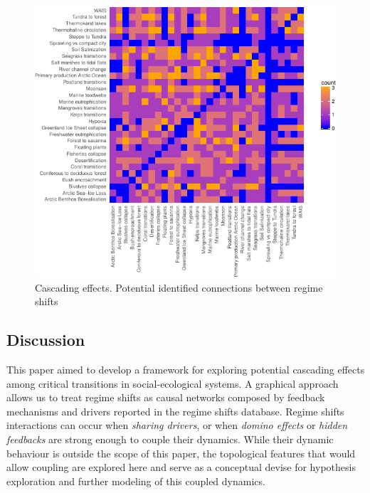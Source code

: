 \documentclass[9pt,]{article}
\begin{document}
\begin{figure}

{\centering \includegraphics{170830_draftCascadingEffects_files/figure-latex/Fig6-1} 

}

\caption{Cascading effects. Potential identified connections between regime shifts}\label{fig:Fig6}
\end{figure}

\subsection{Discussion}\label{discussion}

This paper aimed to develop a framework for exploring potential
cascading effects among critical transitions in social-ecological
systems. A graphical approach allows us to treat regime shifts as causal
networks composed by feedback mechanisms and drivers reported in the
regime shifts database. Regime shifts interactions can occur when
\emph{sharing drivers}, or when \emph{domino effects} or \emph{hidden
feedbacks} are strong enough to couple their dynamics. While their
dynamic behaviour is outside the scope of this paper, the topological
features that would allow coupling are explored here and serve as a
conceptual devise for hypothesis exploration and further modeling of
this coupled dynamics.
\end{document}
